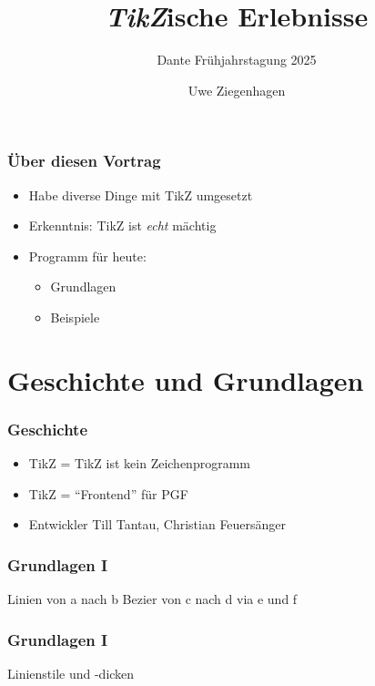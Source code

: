 \documentclass[14pt,ngerman]{beamer}
\author{Uwe Ziegenhagen}
\title{\textit{TikZ}ische Erlebnisse}
\subtitle{Dante Frühjahrstagung 2025}
\begin{document}
\begin{frame}

\maketitle

\end{frame}

\begin{frame}
\frametitle{Über diesen Vortrag}

\begin{itemize}
\item Habe diverse Dinge mit TikZ umgesetzt
\item Erkenntnis: TikZ ist \textit{echt} mächtig 
\item Programm für heute: 
\begin{itemize}
	\item Grundlagen
	\item Beispiele
\end{itemize}

\end{itemize}
\end{frame}

\section{Geschichte und Grundlagen} 

\begin{frame}
\frametitle{Geschichte}

\begin{itemize}
\item TikZ = TikZ ist kein Zeichenprogramm
\item TikZ = \enquote{Frontend} für PGF
\item Entwickler Till Tantau, Christian Feuersänger
\end{itemize}
\end{frame}



\begin{frame}
\frametitle{Grundlagen I}

Linien von a nach b
Bezier von c nach d via e und f

\end{frame}


\begin{frame}
\frametitle{Grundlagen I}

Linienstile und -dicken
\end{frame}
\end{document}
